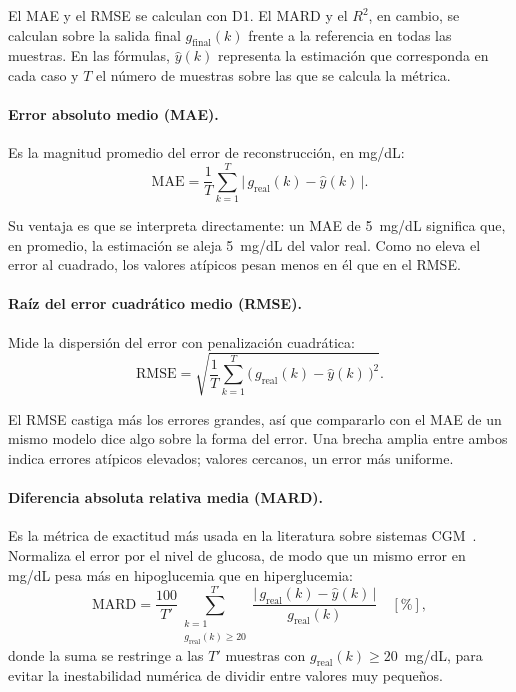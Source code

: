 \documentclass{report}
\begin{document}
El MAE y el RMSE se calculan con D1. El MARD y el $R^2$, en cambio, se calculan sobre la salida final $g_{\mathrm{final}}(k)$ frente a la referencia en todas las muestras. En las fórmulas, $\hat{y}(k)$ representa la estimación que corresponda en cada caso y $T$ el número de muestras sobre las que se calcula la métrica.

\paragraph{Error absoluto medio (MAE).} Es la magnitud promedio del error de reconstrucción, en mg/dL:
\begin{equation}
\label{eq:mae}
\mathrm{MAE} = \frac{1}{T} \sum_{k=1}^{T} \big|\, g_{\mathrm{real}}(k) - \hat{y}(k) \,\big|.
\end{equation}

Su ventaja es que se interpreta directamente: un MAE de 5~mg/dL significa que, en promedio, la estimación se aleja 5~mg/dL del valor real. Como no eleva el error al cuadrado, los valores atípicos pesan menos en él que en el RMSE.

\paragraph{Raíz del error cuadrático medio (RMSE).} Mide la dispersión del error con penalización cuadrática:
\begin{equation}
\label{eq:rmse}
\mathrm{RMSE} = \sqrt{\frac{1}{T} \sum_{k=1}^{T} \big(\, g_{\mathrm{real}}(k) - \hat{y}(k) \,\big)^{2}}.
\end{equation}

El RMSE castiga más los errores grandes, así que compararlo con el MAE de un mismo modelo dice algo sobre la forma del error. Una brecha amplia entre ambos indica errores atípicos elevados; valores cercanos, un error más uniforme.

\paragraph{Diferencia absoluta relativa media (MARD).} Es la métrica de exactitud más usada en la literatura sobre sistemas CGM~\cite{huang2022accuracy}. Normaliza el error por el nivel de glucosa, de modo que un mismo error en mg/dL pesa más en hipoglucemia que en hiperglucemia:
\begin{equation}
\label{eq:mard}
\mathrm{MARD} = \frac{100}{T'} \sum_{\substack{k=1 \\ g_{\mathrm{real}}(k) \geq 20}}^{T'} \frac{\big|\, g_{\mathrm{real}}(k) - \hat{y}(k) \,\big|}{g_{\mathrm{real}}(k)} \quad [\%],
\end{equation}
donde la suma se restringe a las $T'$ muestras con $g_{\mathrm{real}}(k) \geq 20$~mg/dL, para evitar la inestabilidad numérica de dividir entre valores muy pequeños.
\end{document}
